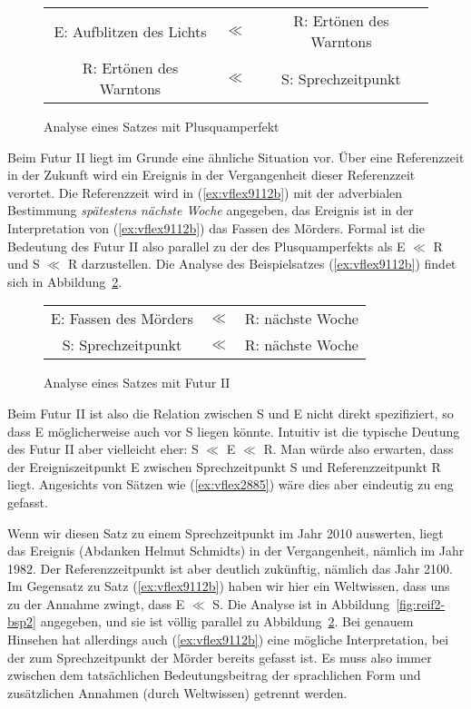 \begin{figure}
  \centering
  \begin{tabular}{ccc}
    E: Aufblitzen des Lichts & $\ll$ & R: Ertönen des Warntons \\
    R: Ertönen des Warntons & $\ll$ & S: Sprechzeitpunkt \\
  \end{tabular}
  \caption{Analyse eines Satzes mit Plusquamperfekt}
  \label{fig:reiplsq-bsp}
\end{figure}

Beim Futur II liegt im Grunde eine ähnliche Situation vor.
Über eine Referenzzeit in der Zukunft wird ein Ereignis in der Vergangenheit dieser Referenzzeit verortet.
Die Referenzzeit wird in (\ref{ex:vflex9112b}) mit der adverbialen Bestimmung \textit{spätestens nächste Woche} angegeben, das Ereignis ist in der Interpretation von (\ref{ex:vflex9112b}) das Fassen des Mörders.
Formal ist die Bedeutung des Futur II also parallel zu der des Plusquamperfekts als E $\ll$ R und  S $\ll$ R darzustellen.
Die Analyse des Beispielsatzes (\ref{ex:vflex9112b}) findet sich in Abbildung~\ref{fig:reif2-bsp}.

\begin{figure}
  \centering
  \begin{tabular}{ccc}
    E: Fassen des Mörders & $\ll$ & R: nächste Woche \\
    S: Sprechzeitpunkt & $\ll$ & R: nächste Woche \\
  \end{tabular}
  \caption{Analyse eines Satzes mit Futur II}
  \label{fig:reif2-bsp}
\end{figure}

Beim Futur II ist also die Relation zwischen S und E nicht direkt spezifiziert, so dass E möglicherweise auch vor S liegen könnte.
Intuitiv ist die typische Deutung des Futur II aber vielleicht eher: S $\ll$ E $\ll$ R.
Man würde also erwarten, dass der Ereigniszeitpunkt E zwischen Sprechzeitpunkt S und Referenzzeitpunkt R liegt.
Angesichts von Sätzen wie (\ref{ex:vflex2885}) wäre dies aber eindeutig zu eng gefasst.

\begin{exe}
\end{exe}

Wenn wir diesen Satz zu einem Sprechzeitpunkt im Jahr 2010 auswerten, liegt das Ereignis (Abdanken Helmut Schmidts) in der Vergangenheit, nämlich im Jahr 1982.
Der Referenzzeitpunkt ist aber deutlich zukünftig, nämlich das Jahr 2100.
Im Gegensatz zu Satz (\ref{ex:vflex9112b}) haben wir hier ein Weltwissen, dass uns zu der Annahme zwingt, dass E $\ll$ S.
Die Analyse ist in Abbildung~\ref{fig:reif2-bsp2} angegeben, und sie ist völlig parallel zu Abbildung~\ref{fig:reif2-bsp}.
Bei genauem Hinsehen hat allerdings auch (\ref{ex:vflex9112b}) eine mögliche Interpretation, bei der zum Sprechzeitpunkt der Mörder bereits gefasst ist.
Es muss also immer zwischen dem tatsächlichen Bedeutungsbeitrag der sprachlichen Form und zusätzlichen Annahmen (\zB durch Weltwissen) getrennt werden.

